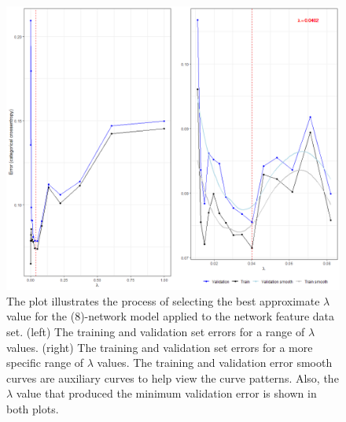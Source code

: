 \begin{figure}
	\begin{center}
		\includegraphics[scale = 0.55]{fig/CH3/network_mod_1_lambda_plot.png}
		\caption{The plot illustrates the process of selecting the best approximate $\lambda$ value for the (8)-network model applied to the network feature data set. (left) The training and validation set errors for a range of $\lambda$ values. (right) The training and validation set errors for a more specific range of $\lambda$ values. The training and validation error smooth curves are auxiliary curves to help view the curve patterns. Also, the $\lambda$ value that produced the minimum validation error is shown in both plots.}
		\label{fig:ch3_nn_validation_mod1_network}
	\end{center}	
\end{figure}

